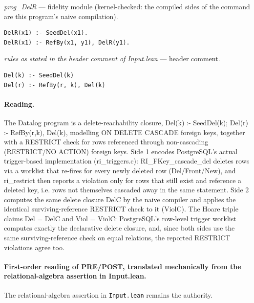 \documentclass[10pt]{article}
\begin{document}
{\raggedright\textit{prog\_DelR} --- fidelity module (kernel-checked: the compiled sides of the command are this program's naive compilation).\par}

\begin{Verbatim}[fontsize=\scriptsize,breaklines=true,breakanywhere=true,frame=single,framesep=1.5mm]
DelR(x1) :- SeedDel(x1).
DelR(x1) :- RefBy(x1, y1), DelR(y1).
\end{Verbatim}

{\raggedright\textit{rules as stated in the header comment of Input.lean} --- header comment.\par}

\begin{Verbatim}[fontsize=\scriptsize,breaklines=true,breakanywhere=true,frame=single,framesep=1.5mm]
Del(k) :- SeedDel(k)
Del(r) :- RefBy(r, k), Del(k)
\end{Verbatim}

\paragraph{Reading.} The Datalog program is a delete-reachability closure, Del(k) :- SeedDel(k); Del(r) :- RefBy(r,k), Del(k), modelling ON DELETE CASCADE foreign keys, together with a RESTRICT check for rows referenced through non-cascading (RESTRICT/NO ACTION) foreign keys. Side 1 encodes PostgreSQL's actual trigger-based implementation (ri\_triggers.c): RI\_FKey\_cascade\_del deletes rows via a worklist that re-fires for every newly deleted row (Del/Front/New), and ri\_restrict then reports a violation only for rows that still exist and reference a deleted key, i.e. rows not themselves cascaded away in the same statement. Side 2 computes the same delete closure DelC by the naive compiler and applies the identical surviving-reference RESTRICT check to it (ViolC). The Hoare triple claims Del = DelC and Viol = ViolC: PostgreSQL's row-level trigger worklist computes exactly the declarative delete closure, and, since both sides use the same surviving-reference check on equal relations, the reported RESTRICT violations agree too.

\paragraph{First-order reading of PRE/POST, translated mechanically from the relational-algebra assertion in Input.lean.} The relational-algebra assertion in \texttt{Input.lean} remains the authority.
\end{document}
